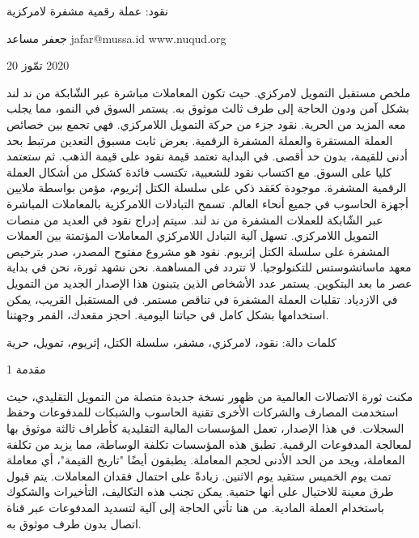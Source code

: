 ﻿نقود: عملة رقمية مشفرة لامركزية




جعفر مساعد
‫‪jafar@mussa.id‬‬
‫‪www.nuqud.org‬‬


‫‪20‬‬ تمّوز ‫‪2020‬‬




‫ملخص‬
مستقبل التمويل لامركزي. حيث تكون المعاملات مباشرة عبر الشّابكة من ند لند بشكل آمن ودون الحاجة إلى طرف ثالث موثوق به. يستمر السوق في النمو، مما يجلب معه المزيد من الحرية. نقود جزء من حركة التمويل اللامركزي. فهي تجمع بين خصائص العملة المستقرة والعملة المشفرة الرقمية. بعرض ثابت مسبوق التعدين مرتبط بحد أدنى للقيمة، بدون حد أقصى. في البداية تعتمد قيمة نقود على قيمة الذهب. ثم ستعتمد كليا على السوق. مع اكتساب نقود للشعبية، تكتسب فائدة كشكل من أشكال العملة الرقمية المشفرة. موجودة كعَقد ذكي على سلسلة الكتل إثريوم، مؤمن بواسطة ملايين أجهزة الحاسوب في جميع أنحاء العالم. تسمح التبادلات اللامركزية بالمعاملات المباشرة عبر الشّابكة للعملات المشفرة من ند لند. سيتم إدراج نقود في العديد من منصات التمويل اللامركزي. تسهل آلية التبادل اللامركزي المعاملات المؤتمتة بين العملات المشفرة على سلسلة الكتل إثريوم. نقود هو مشروع مفتوح المصدر، صدر بترخيص معهد ماساتشوستس للتكنولوجيا. لا تتردد في المساهمة. نحن نشهد ثورة، نحن في بداية عصر ما بعد البتكوين. يستمر عدد الأشخاص الذين يتبنون هذا الإصدار الجديد من التمويل في الازدياد. تقلبات العملة المشفرة في تناقص مستمر. في المستقبل القريب، يمكن استخدامها بشكل كامل في حياتنا اليومية. احجز مقعدك، القمر وجهتنا.


كلمات دالة:  نقود، لامركزي، مشفر، سلسلة الكتل، إثريوم، تمويل، حرية




‫‪1‬‬  ‫مقدمة‬


مكنت ثورة الاتصالات العالمية من ظهور نسخة جديدة متصلة من التمويل التقليدي، حيث استخدمت المصارف والشركات الأخرى تقنية الحاسوب والشبكات للمدفوعات وحفظ السجلات. في هذا الإصدار، تعمل المؤسسات المالية التقليدية كأطراف ثالثة موثوق بها لمعالجة المدفوعات الرقمية. تطبق هذه المؤسسات تكلفة الوساطة، مما يزيد من تكلفة المعاملة، ويحد من الحد الأدنى لحجم المعاملة. يطبقون أيضًا "تاريخ القيمة"، أي معاملة تمت يوم الخميس ستقيد يوم الاثنين. زيادةً على احتمال فقدان المعاملات. يتم قبول طرق معينة للاحتيال على أنها حتمية. يمكن تجنب هذه التكاليف، التأخيرات والشكوك باستخدام العملة المادية. من هنا تأتي الحاجة إلى آلية لتسديد المدفوعات عبر قناة اتصال بدون طرف موثوق به.


